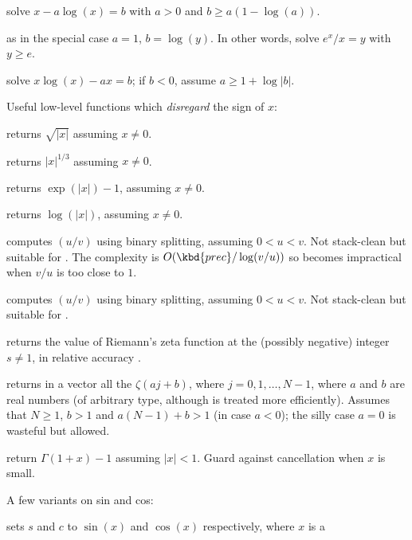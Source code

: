 solve $x - a  \log(x) = b$ with $a > 0$ and $b \geq a (1 - \log(a))$.

 as 
in the special case $a = 1$, $b = \log(y)$. In other words,
solve $e^x / x = y$ with $y \geq e$.

solve $x  \log(x) - a  x = b$; if $b < 0$, assume $a \geq 1 + \log |b|$.

\noindent Useful low-level functions which \emph{disregard} the sign of $x$:

 returns $\sqrt{|x|}$ assuming $x\neq 0$.

 returns $|x|^{1/3}$ assuming $x\neq 0$.

 returns $\exp(|x|) - 1$, assuming $x \neq 0$.

 returns $\log(|x|)$, assuming $x \neq 0$.


 computes $(u/v)$
using binary splitting, assuming $0 < u < v$. Not stack-clean but suitable
for . The complexity is $O(\kbd{prec} / \log(v/u))$
so becomes impractical when $v/u$ is too close to $1$.

 computes $(u/v)$
using binary splitting, assuming $0 < u < v$. Not stack-clean but suitable
for .

 returns the value of Riemann's zeta
function at the (possibly negative) integer $s\neq 1$, in relative accuracy
.

 returns in a vector
all the $\zeta(aj + b)$, where $j = 0, 1, \dots, N-1$, where $a$ and
$b$ are real numbers (of arbitrary type, although  is treated
more efficiently). Assumes that $N \geq 1$, $b > 1$ and $a(N-1) + b > 1$
(in case $a < 0$); the silly case $a = 0$ is wasteful but allowed.

 return $\Gamma(1+x) - 1$ assuming
$|x| < 1$. Guard against cancellation when $x$ is small.

\noindent A few variants on sin and cos:

 sets $s$ and $c$ to
$\sin(x)$ and $\cos(x)$ respectively, where $x$ is a 

